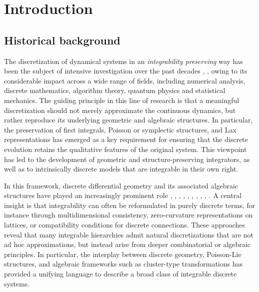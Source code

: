 \documentclass[10pt]{amsart}
\numberwithin{equation}{section}
\theoremstyle{definition}
\begin{document}
\date{July 2, 2026}
\maketitle

\tableofcontents

\vspace{3mm}

\section{Introduction}
\label{sec1}

\subsection{Historical background}
\label{sec1.1}

The discretization of dynamical systems in an
\textit{integrability preserving} way has been the subject of intensive
investigation over the past decades \cite{Suris},
\cite{VeselovRMS1991}, owing to its considerable impact across a wide range
of fields, including numerical analysis, discrete mathematics, algorithm
theory, quantum physics and statistical mechanics. The guiding principle
in this line of research is that a meaningful discretization should not
merely approximate the continuous dynamics, but rather reproduce its underlying
geometric and algebraic structures. In particular, the preservation of
first integrals, Poisson or symplectic structures, and Lax representations
has emerged as a key requirement for ensuring that the discrete evolution
retains the qualitative features of the original system. This viewpoint
has led to the development of geometric and structure-preserving integrators,
as well as to intrinsically discrete models that are integrable in their
own right.

In this framework, discrete differential geometry and its associated algebraic
structures have played an increasingly prominent role \cite{AL1}, \cite{BS1},
\cite{BS2}, \cite{GK}, \cite{Nov1}, \cite{Nov2}, \cite{Nov3},
\cite{LNP}, \cite{Kuper1}, \cite{MV}. A central insight is that integrability
can often be reformulated in purely discrete terms, for instance through
multidimensional consistency, zero-curvature representations on lattices,
or compatibility conditions for discrete connections. These approaches
reveal that many integrable hierarchies admit natural discretizations that
are not ad hoc approximations, but instead arise from deeper combinatorial
or algebraic principles. In particular, the interplay between discrete
geometry, Poisson-Lie structures, and algebraic frameworks such as cluster-type
transformations has provided a unifying language to describe a broad class
of integrable discrete systems.
\end{document}
